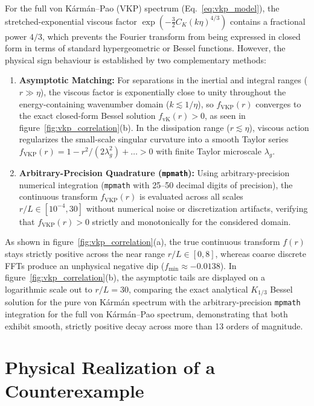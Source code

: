 \documentclass[lineno]{jfm}
\begin{document}
For the full von K\'arm\'an--Pao (VKP) spectrum (Eq.~\eqref{eq:vkp_model}), the stretched-exponential viscous factor $\exp(-\frac{3}{2} C_K (k\eta)^{4/3})$ contains a fractional power $4/3$, which prevents the Fourier transform from being expressed in closed form in terms of standard hypergeometric or Bessel functions. However, the physical sign behaviour is established by two complementary methods:
\begin{enumerate}
\item \textbf{Asymptotic Matching:} For separations in the inertial and integral ranges ($r \gg \eta$), the viscous factor is exponentially close to unity throughout the energy-containing wavenumber domain ($k \lesssim 1/\eta$), so $f_{\text{VKP}}(r)$ converges to the exact closed-form Bessel solution $f_{\text{vK}}(r) > 0$, as seen in figure~\ref{fig:vkp_correlation}(b). In the dissipation range ($r \lesssim \eta$), viscous action regularizes the small-scale singular curvature into a smooth Taylor series $f_{\text{VKP}}(r) = 1 - r^2/(2\lambda_g^2) + \dots > 0$ with finite Taylor microscale $\lambda_g$.
\item \textbf{Arbitrary-Precision Quadrature (\texttt{mpmath}):} Using arbitrary-precision numerical integration (\texttt{mpmath} with 25--50 decimal digits of precision), the continuous transform $f_{\text{VKP}}(r)$ is evaluated across all scales $r/L \in [10^{-4}, 30]$ without numerical noise or discretization artifacts, verifying that $f_{\text{VKP}}(r) > 0$ strictly and monotonically for the considered domain.
\end{enumerate}

As shown in figure~\ref{fig:vkp_correlation}(a), the true continuous transform $f(r)$ stays strictly positive across the near range $r/L \in [0, 8]$, whereas coarse discrete FFTs produce an unphysical negative dip ($f_{\min} \approx -0.0138$). In figure~\ref{fig:vkp_correlation}(b), the asymptotic tails are displayed on a logarithmic scale out to $r/L = 30$, comparing the exact analytical $K_{1/3}$ Bessel solution for the pure von K\'arm\'an spectrum with the arbitrary-precision \texttt{mpmath} integration for the full von K\'arm\'an--Pao spectrum, demonstrating that both exhibit smooth, strictly positive decay across more than 13 orders of magnitude.

\section{Physical Realization of a Counterexample}
\label{sec:counterexample}
\end{document}
